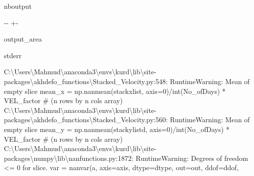 \documentclass[letterpaper,10pt]{sphinxmanual}
\newlength\nbsphinxcodecellspacing
\begin{document}
\begin{sphinxuseclass}{nboutput}
{

\kern-\sphinxverbatimsmallskipamount\kern-\baselineskip
\kern+\FrameHeightAdjust\kern-\fboxrule
\vspace{\nbsphinxcodecellspacing}

\begin{sphinxuseclass}{output_area}
\begin{sphinxuseclass}{stderr}


\begin{sphinxVerbatim}[commandchars=\\\{\}]
C:\textbackslash{}Users\textbackslash{}Mahmud\textbackslash{}anaconda3\textbackslash{}envs\textbackslash{}kurd\textbackslash{}lib\textbackslash{}site-packages\textbackslash{}akhdefo\_functions\textbackslash{}Stacked\_Velocity.py:548: RuntimeWarning: Mean of empty slice
  mean\_x = np.nanmean(stackxlist, axis=0)/int(No\_ofDays) * VEL\_factor  \# (n rows by n cols array)
C:\textbackslash{}Users\textbackslash{}Mahmud\textbackslash{}anaconda3\textbackslash{}envs\textbackslash{}kurd\textbackslash{}lib\textbackslash{}site-packages\textbackslash{}akhdefo\_functions\textbackslash{}Stacked\_Velocity.py:560: RuntimeWarning: Mean of empty slice
  mean\_y = np.nanmean(stackylistd, axis=0)/int(No\_ofDays) * VEL\_factor  \# (n rows by n cols array)
C:\textbackslash{}Users\textbackslash{}Mahmud\textbackslash{}anaconda3\textbackslash{}envs\textbackslash{}kurd\textbackslash{}lib\textbackslash{}site-packages\textbackslash{}numpy\textbackslash{}lib\textbackslash{}nanfunctions.py:1872: RuntimeWarning: Degrees of freedom <= 0 for slice.
  var = nanvar(a, axis=axis, dtype=dtype, out=out, ddof=ddof,
\end{sphinxVerbatim}



\end{sphinxuseclass}
\end{sphinxuseclass}
}

\end{sphinxuseclass}
\end{document}
